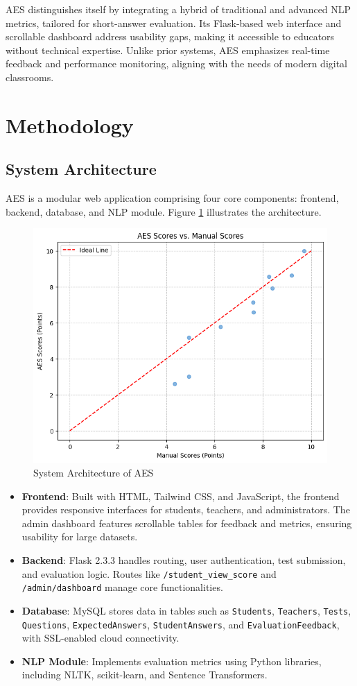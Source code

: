 \documentclass[conference]{IEEEtran}
\begin{document}
AES distinguishes itself by integrating a hybrid of traditional and advanced NLP metrics, tailored for short-answer evaluation. Its Flask-based web interface and scrollable dashboard address usability gaps, making it accessible to educators without technical expertise. Unlike prior systems, AES emphasizes real-time feedback and performance monitoring, aligning with the needs of modern digital classrooms.

\section{Methodology}
\subsection{System Architecture}
AES is a modular web application comprising four core components: frontend, backend, database, and NLP module. Figure \ref{fig:architecture} illustrates the architecture.

\begin{figure}[h]
    \centering
    \includegraphics[width=0.8\columnwidth]{architecture.png}
    \caption{System Architecture of AES}
    \label{fig:architecture}
\end{figure}

\begin{itemize}
    \item \textbf{Frontend}: Built with HTML, Tailwind CSS, and JavaScript, the frontend provides responsive interfaces for students, teachers, and administrators. The admin dashboard features scrollable tables for feedback and metrics, ensuring usability for large datasets.
    \item \textbf{Backend}: Flask 2.3.3 handles routing, user authentication, test submission, and evaluation logic. Routes like \texttt{/student\_view\_score} and \texttt{/admin/dashboard} manage core functionalities.
    \item \textbf{Database}: MySQL stores data in tables such as \texttt{Students}, \texttt{Teachers}, \texttt{Tests}, \texttt{Questions}, \texttt{ExpectedAnswers}, \texttt{StudentAnswers}, and \texttt{EvaluationFeedback}, with SSL-enabled cloud connectivity.
    \item \textbf{NLP Module}: Implements evaluation metrics using Python libraries, including NLTK, scikit-learn, and Sentence Transformers.
\end{itemize}
\end{document}
